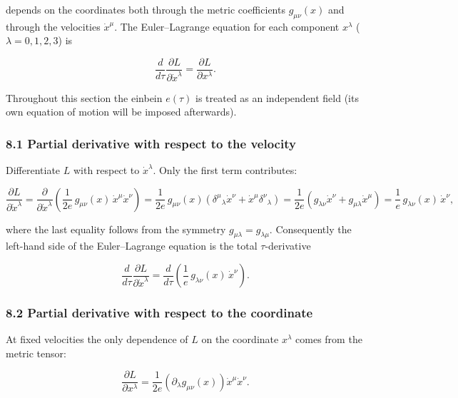 \documentclass[
]{article}
\begin{document}
depends on the coordinates both through the metric coefficients
\(g_{\mu\nu}(x)\) and through the velocities \(\dot{x}^{\mu}\). The
Euler--Lagrange equation for each component \(x^{\lambda}\)
(\(\lambda = 0, 1, 2, 3\)) is

\[\frac{d}{d\tau} \frac{\partial L}{\partial \dot{x}^{\lambda}} = \frac{\partial L}{\partial x^{\lambda}}. \tag{32}\]

Throughout this section the einbein \(e(\tau)\) is treated as an
independent field (its own equation of motion will be imposed
afterwards).

\hypertarget{partial-derivative-with-respect-to-the-velocity}{%
\subsubsection{8.1 Partial derivative with respect to the
velocity}\label{partial-derivative-with-respect-to-the-velocity}}

Differentiate \(L\) with respect to \(\dot{x}^{\lambda}\). Only the
first term contributes:

\[\frac{\partial L}{\partial \dot{x}^{\lambda}} = \frac{\partial}{\partial \dot{x}^{\lambda}} \left( \frac{1}{2e}\, g_{\mu\nu}(x)\, \dot{x}^{\mu} \dot{x}^{\nu} \right)
= \frac{1}{2e}\, g_{\mu\nu}(x) \left( \delta^{\mu}{}_{\lambda} \dot{x}^{\nu} + \dot{x}^{\mu} \delta^{\nu}{}_{\lambda} \right)
= \frac{1}{2e} \left( g_{\lambda\nu} \dot{x}^{\nu} + g_{\mu\lambda} \dot{x}^{\mu} \right)
= \frac{1}{e}\, g_{\lambda\nu}(x)\, \dot{x}^{\nu}, \tag{33}\]

where the last equality follows from the symmetry
\(g_{\mu\lambda} = g_{\lambda\mu}\). Consequently the left-hand side of
the Euler--Lagrange equation is the total \(\tau\)-derivative

\[\frac{d}{d\tau} \frac{\partial L}{\partial \dot{x}^{\lambda}} = \frac{d}{d\tau} \left( \frac{1}{e}\, g_{\lambda\nu}(x)\, \dot{x}^{\nu} \right). \tag{34}\]

\hypertarget{partial-derivative-with-respect-to-the-coordinate}{%
\subsubsection{8.2 Partial derivative with respect to the
coordinate}\label{partial-derivative-with-respect-to-the-coordinate}}

At fixed velocities the only dependence of \(L\) on the coordinate
\(x^{\lambda}\) comes from the metric tensor:

\[\frac{\partial L}{\partial x^{\lambda}} = \frac{1}{2e} \left( \partial_{\lambda} g_{\mu\nu}(x) \right) \dot{x}^{\mu} \dot{x}^{\nu}. \tag{35}\]
\end{document}
